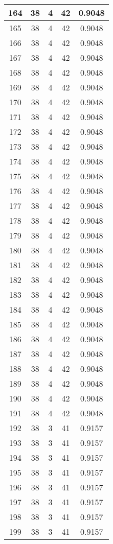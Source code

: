 \documentclass[letterpaper, 12pt]{article}
\begin{document}
\begin{longtable}{|c|c|c|c|c|}
\hline
164 & 38 & 4 & 42 & 0.9048 \\
\hline
165 & 38 & 4 & 42 & 0.9048 \\
\hline
166 & 38 & 4 & 42 & 0.9048 \\
\hline
167 & 38 & 4 & 42 & 0.9048 \\
\hline
168 & 38 & 4 & 42 & 0.9048 \\
\hline
169 & 38 & 4 & 42 & 0.9048 \\
\hline
170 & 38 & 4 & 42 & 0.9048 \\
\hline
171 & 38 & 4 & 42 & 0.9048 \\
\hline
172 & 38 & 4 & 42 & 0.9048 \\
\hline
173 & 38 & 4 & 42 & 0.9048 \\
\hline
174 & 38 & 4 & 42 & 0.9048 \\
\hline
175 & 38 & 4 & 42 & 0.9048 \\
\hline
176 & 38 & 4 & 42 & 0.9048 \\
\hline
177 & 38 & 4 & 42 & 0.9048 \\
\hline
178 & 38 & 4 & 42 & 0.9048 \\
\hline
179 & 38 & 4 & 42 & 0.9048 \\
\hline
180 & 38 & 4 & 42 & 0.9048 \\
\hline
181 & 38 & 4 & 42 & 0.9048 \\
\hline
182 & 38 & 4 & 42 & 0.9048 \\
\hline
183 & 38 & 4 & 42 & 0.9048 \\
\hline
184 & 38 & 4 & 42 & 0.9048 \\
\hline
185 & 38 & 4 & 42 & 0.9048 \\
\hline
186 & 38 & 4 & 42 & 0.9048 \\
\hline
187 & 38 & 4 & 42 & 0.9048 \\
\hline
188 & 38 & 4 & 42 & 0.9048 \\
\hline
189 & 38 & 4 & 42 & 0.9048 \\
\hline
190 & 38 & 4 & 42 & 0.9048 \\
\hline
191 & 38 & 4 & 42 & 0.9048 \\
\hline
192 & 38 & 3 & 41 & 0.9157 \\
\hline
193 & 38 & 3 & 41 & 0.9157 \\
\hline
194 & 38 & 3 & 41 & 0.9157 \\
\hline
195 & 38 & 3 & 41 & 0.9157 \\
\hline
196 & 38 & 3 & 41 & 0.9157 \\
\hline
197 & 38 & 3 & 41 & 0.9157 \\
\hline
198 & 38 & 3 & 41 & 0.9157 \\
\hline
199 & 38 & 3 & 41 & 0.9157 \\
\hline
\end{longtable}
\end{document}
